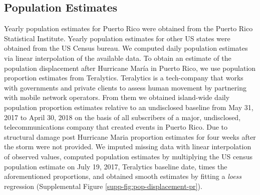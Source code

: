 \documentclass[11pt]{article}
\begin{document}
\subsection{Population Estimates}
\label{subsec:population}
Yearly population estimates for Puerto Rico were obtained from the Puerto Rico Statistical Institute. Yearly population estimates for other US states were obtained from the US Census bureau. We computed daily population estimates via linear interpolation of the available data. To obtain an estimate of the population displacement after Hurricane Mar\'ia in Puerto Rico, we use population proportion estimates from Teralytics. Teralytics is a tech-company that works with governments and private clients to assess human movement by partnering with mobile network operators. From them we obtained island-wide daily population proportion estimates relative to an undisclosed baseline from May 31, 2017 to April 30, 2018 on the basis of all subscribers of a major, undisclosed, telecommunications company that created events in Puerto Rico. Due to structural damage post Hurricane Maria proportion estimates for four weeks after the storm were not provided. We imputed missing data with linear interpolation of observed values, computed population estimates by multiplying the US census population estimate on July 19, 2017, Teralytics baseline date, times the aforementioned proportions, and obtained smooth estimates by fitting a \textit{loess} regression (Supplemental Figure \ref{supp-fig:pop-displacement-pr}).
\end{document}
